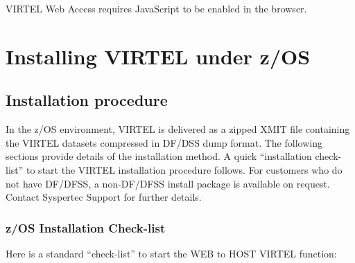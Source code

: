 \documentclass[letterpaper,10pt,english]{sphinxmanual}
\begin{document}
VIRTEL Web Access requires JavaScript to be enabled in the browser.

\label{\detokenize{Installation_Guide:vvrrig-installz-os}}
\ignorespaces 

\chapter{Installing VIRTEL under z/OS}
\label{\detokenize{Installation_Guide:installing-virtel-under-z-os}}\label{\detokenize{Installation_Guide:index-2}}

\section{Installation procedure}
\label{\detokenize{Installation_Guide:installation-procedure}}
In the z/OS environment, VIRTEL is delivered as a zipped XMIT file containing the VIRTEL datasets compressed in DF/DSS dump format. The following sections provide details of the installation method. A quick “installation check-list” to start the VIRTEL installation procedure follows. For customers who do not have DF/DFSS, a non-DF/DFSS install package is available on request. Contact Syspertec Support for further details.

\ignorespaces 

\subsection{z/OS Installation Check-list}
\label{\detokenize{Installation_Guide:z-os-installation-check-list}}\label{\detokenize{Installation_Guide:index-3}}
Here is a standard “check-list” to start the WEB to HOST VIRTEL function:
\end{document}
